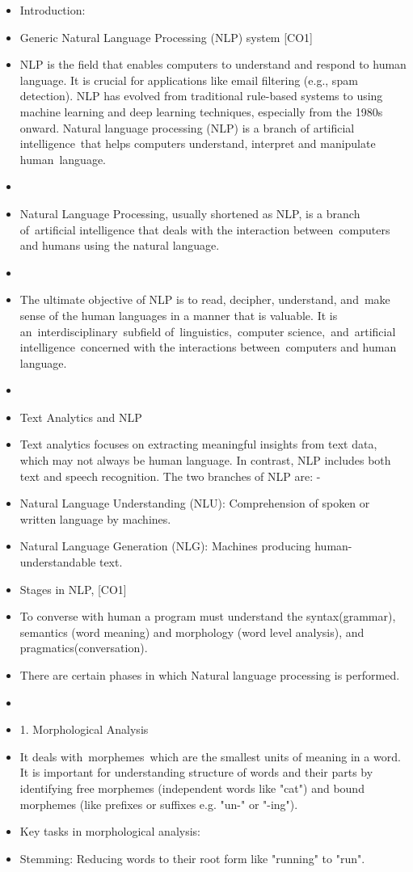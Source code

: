 \documentclass[11pt,a4paper]{article}
\begin{document}
\begin{itemize}
    \item Introduction: 
    \item Generic Natural Language Processing (NLP) system [CO1]
    \item NLP is the field that enables computers to understand and respond to human language. It is crucial for applications like email filtering (e.g., spam detection). NLP has evolved from traditional rule-based systems to using machine learning and deep learning techniques, especially from the 1980s onward. Natural language processing (NLP) is a branch of artificial intelligence that helps computers understand, interpret and manipulate human language. ​
    \item ​
    \item Natural Language Processing, usually shortened as NLP, is a branch of artificial intelligence that deals with the interaction between computers and humans using the natural language. ​
    \item ​
    \item The ultimate objective of NLP is to read, decipher, understand, and make sense of the human languages in a manner that is valuable. It is an interdisciplinary subfield of linguistics, computer science, and artificial intelligence concerned with the interactions between computers and human language​.
    \item  ​
    \item Text Analytics and NLP 
    \item Text analytics focuses on extracting meaningful insights from text data, which may not always be human language. In contrast, NLP includes both text and speech recognition. The two branches of NLP are: - 
    \item Natural Language Understanding (NLU): Comprehension of spoken or written language by machines. 
    \item Natural Language Generation (NLG): Machines producing human-understandable text.
    \item Stages in NLP, [CO1]
    \item To converse with human a program must understand the syntax(grammar), semantics (word meaning) and morphology (word level analysis), and pragmatics(conversation). ​
    \item There are certain phases in which Natural language processing is performed.
    \item  ​
    \item 1. Morphological Analysis
    \item It deals with morphemes which are the smallest units of meaning in a word. It is important for understanding structure of words and their parts by identifying free morphemes (independent words like "cat") and bound morphemes (like prefixes or suffixes e.g. "un-" or "-ing").
    \item Key tasks in morphological analysis:
    \item Stemming: Reducing words to their root form like "running" to "run".
\end{itemize}
\end{document}
